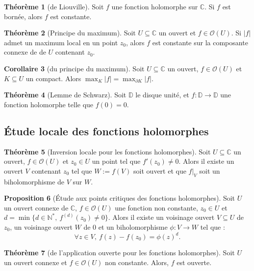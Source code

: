 \documentclass[11pt,a4paper]{article}
\newcommand{\N}{\mathbb{N}}
\newcommand{\D}{\mathbb{D}}
\newcommand{\C}{\mathbb{C}}
\theoremstyle{definition}
\newtheorem{theoreme}{Th\'eor\`eme}[section]
\newtheorem{prop}[theoreme]{Proposition}
\newtheorem{corollaire}[theoreme]{Corollaire}
\theoremstyle{plain}
\begin{document}
 \begin{theoreme}[de Liouville]
 Soit $f$ une fonction holomorphe sur $\C$.
 Si $f$ est bornée, alors $f$ est constante.
 \end{theoreme}
 

 
\begin{theoreme}[Principe du maximum]
Soit $U\subseteq \C$ un ouvert et $f \in \mathcal O(U)$.
Si $|f|$ admet un maximum local en un point $z_0$, alors $f$ est constante sur la composante connexe de de $U$ contenant $z_0$.
\end{theoreme}

\begin{corollaire}[du principe du maximum]
Soit $U\subseteq \C$ un ouvert,  $f \in \mathcal O(U)$ et $K\subseteq U$ un compact.
Alors $\max_{K} |f| = \max_{\partial K} |f|$.
\end{corollaire}

\begin{theoreme}[Lemme de Schwarz]
Soit $\D$ le disque unité, et $f :\D\to \D$ une fonction holomorphe telle que $f(0)=0$.
\end{theoreme}




\subsection{Étude locale des fonctions holomorphes}

\begin{theoreme}[Inversion locale pour les fonctions holomorphes]
Soit $U\subseteq \C$ un ouvert, $f\in \mathcal O(U)$ et $z_0\in U$ un point tel que $f'(z_0)\neq 0$.
Alors il existe un ouvert $V$ contenant $z_0$ tel que $W:=f(V)$ soit ouvert et que $f|_V$ soit un biholomorphisme de $V$ sur $W$.
\end{theoreme}

\begin{prop}[Étude aux points critiques des fonctions holomorphes]
Soit $U$ un ouvert connexe de $\C$, $f\in \mathcal O(U)$ une fonction non constante, $z_0\in U$ et $d = \min\{d\in \N^*,\: f^{(d)}(z_0)\neq 0\}$.
Alors il existe un voisinage ouvert $V\subseteq U$ de $z_0$, un voisinage ouvert  $W$ de $0$ et un biholomorphisme $\phi : V\to W$ tel que : 
\[ \forall z\in V, \: f(z) - f(z_0) = \phi(z)^d. \]
\end{prop}


\begin{theoreme}[de l'application ouverte pour les fonctions holomorphes]
Soit $U$ un ouvert connexe et $f\in \mathcal O(U)$ non constante.
Alors, $f$ est ouverte.
\end{theoreme}
\end{document}
